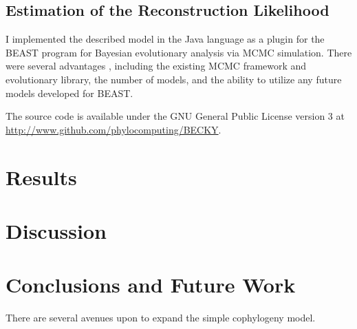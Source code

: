 \documentclass[12pt,letterpaper]{article}
\begin{document}
\subsection*{Estimation of the Reconstruction Likelihood}

I implemented the described model in the Java language as a plugin for the BEAST program \parencite{Drummond:2012} for Bayesian evolutionary analysis via \ac{MCMC} simulation. There were several advantages , including  the existing \ac{MCMC} framework and evolutionary library, the number of models, and the ability to utilize any future models developed for BEAST.

The source code is available under the GNU General Public License version 3 at \url{http://www.github.com/phylocomputing/BECKY}.

\section*{Results}

\section*{Discussion}

\section*{Conclusions and Future Work}


There are several avenues upon to expand the simple cophylogeny model. 

\printbibliography
\end{document}

